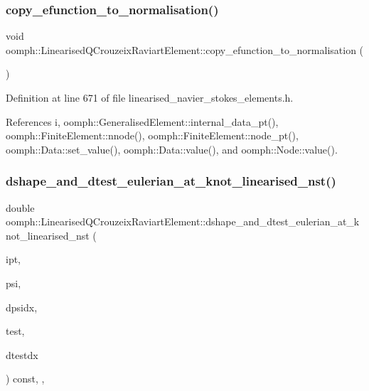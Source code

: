 \subsubsection{\texorpdfstring{copy\+\_\+efunction\+\_\+to\+\_\+normalisation()}{copy\_efunction\_to\_normalisation()}}
{\footnotesize\ttfamily void oomph\+::\+Linearised\+Q\+Crouzeix\+Raviart\+Element\+::copy\+\_\+efunction\+\_\+to\+\_\+normalisation (\begin{DoxyParamCaption}{ }\end{DoxyParamCaption})\hspace{0.3cm}{\ttfamily [inline]}}



Definition at line 671 of file linearised\+\_\+navier\+\_\+stokes\+\_\+elements.\+h.



References i, oomph\+::\+Generalised\+Element\+::internal\+\_\+data\+\_\+pt(), oomph\+::\+Finite\+Element\+::nnode(), oomph\+::\+Finite\+Element\+::node\+\_\+pt(), oomph\+::\+Data\+::set\+\_\+value(), oomph\+::\+Data\+::value(), and oomph\+::\+Node\+::value().

\mbox{\label{classoomph_1_1LinearisedQCrouzeixRaviartElement_ae3b60d3e296e3a17d3e1ef48356f8dc3}} 
\subsubsection{\texorpdfstring{dshape\+\_\+and\+\_\+dtest\+\_\+eulerian\+\_\+at\+\_\+knot\+\_\+linearised\+\_\+nst()}{dshape\_and\_dtest\_eulerian\_at\_knot\_linearised\_nst()}}
{\footnotesize\ttfamily double oomph\+::\+Linearised\+Q\+Crouzeix\+Raviart\+Element\+::dshape\+\_\+and\+\_\+dtest\+\_\+eulerian\+\_\+at\+\_\+knot\+\_\+linearised\+\_\+nst (\begin{DoxyParamCaption}\item[{const unsigned \&}]{ipt,  }\item[{\hyperlink{classoomph_1_1Shape}{Shape} \&}]{psi,  }\item[{\hyperlink{classoomph_1_1DShape}{D\+Shape} \&}]{dpsidx,  }\item[{\hyperlink{classoomph_1_1Shape}{Shape} \&}]{test,  }\item[{\hyperlink{classoomph_1_1DShape}{D\+Shape} \&}]{dtestdx }\end{DoxyParamCaption}) const\hspace{0.3cm}{\ttfamily [inline]}, {\ttfamily [protected]}, {\ttfamily [virtual]}}



